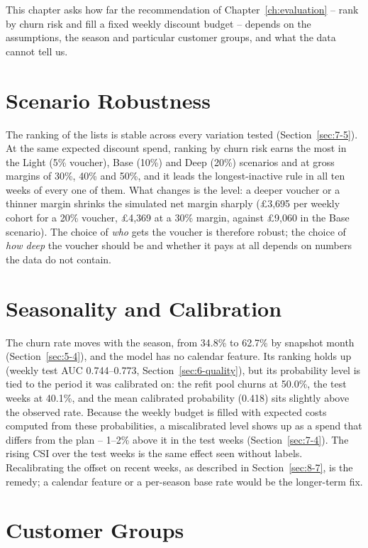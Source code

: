 This chapter asks how far the recommendation of Chapter~\ref{ch:evaluation} -- rank by churn risk and fill a fixed weekly discount budget -- depends on the assumptions, the season and particular customer groups, and what the data cannot tell us.

\section{Scenario Robustness}
\label{sec:9-1}

The ranking of the lists is stable across every variation tested (Section~\ref{sec:7-5}). At the same expected discount spend, ranking by churn risk earns the most in the Light (5\% voucher), Base (10\%) and Deep (20\%) scenarios and at gross margins of 30\%, 40\% and 50\%, and it leads the longest-inactive rule in all ten weeks of every one of them. What changes is the level: a deeper voucher or a thinner margin shrinks the simulated net margin sharply (\pounds3,695 per weekly cohort for a 20\% voucher, \pounds4,369 at a 30\% margin, against \pounds9,060 in the Base scenario). The choice of \emph{who} gets the voucher is therefore robust; the choice of \emph{how deep} the voucher should be and whether it pays at all depends on numbers the data do not contain.

\section{Seasonality and Calibration}
\label{sec:9-2}

The churn rate moves with the season, from 34.8\% to 62.7\% by snapshot month (Section~\ref{sec:5-4}), and the model has no calendar feature. Its ranking holds up (weekly test AUC 0.744--0.773, Section~\ref{sec:6-quality}), but its probability level is tied to the period it was calibrated on: the refit pool churns at 50.0\%, the test weeks at 40.1\%, and the mean calibrated probability (0.418) sits slightly above the observed rate. Because the weekly budget is filled with expected costs computed from these probabilities, a miscalibrated level shows up as a spend that differs from the plan -- 1--2\% above it in the test weeks (Section~\ref{sec:7-4}). The rising CSI over the test weeks is the same effect seen without labels. Recalibrating the offset on recent weeks, as described in Section~\ref{sec:8-7}, is the remedy; a calendar feature or a per-season base rate would be the longer-term fix.

\section{Customer Groups}
\label{sec:9-3}

